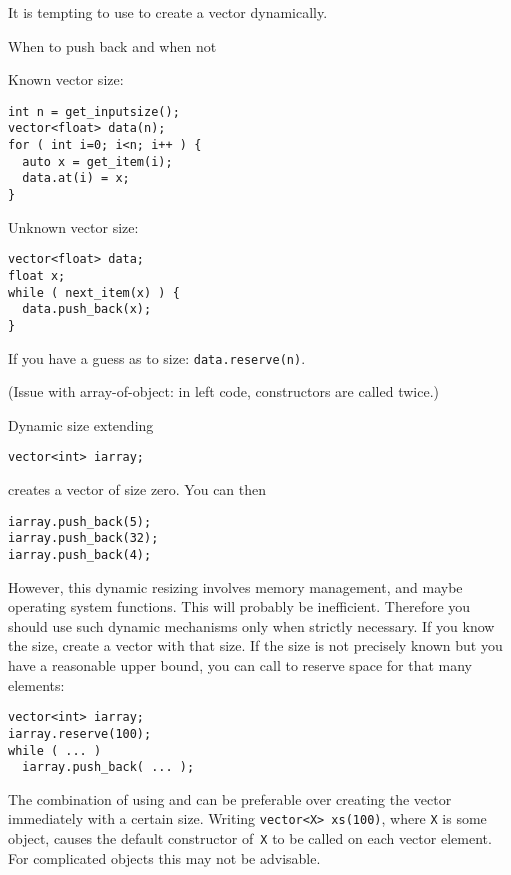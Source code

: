 It is tempting to use  to create a vector dynamically.

\begin{block}{When to push back and when not}
  \label{sl:vecpushnot}
  \begin{multicols}{2}
    Known vector size:
\begin{lstlisting}
int n = get_inputsize();
vector<float> data(n);
for ( int i=0; i<n; i++ ) {
  auto x = get_item(i);
  data.at(i) = x;
}
\end{lstlisting}
\columnbreak
    Unknown vector size:
\begin{lstlisting}
vector<float> data;
float x;
while ( next_item(x) ) {
  data.push_back(x);
}
\end{lstlisting}
  \end{multicols}
  If you have a guess as to size: \lstinline+data.reserve(n)+.

  (Issue with array-of-object: in left code, constructors are called twice.)
\end{block}

\begin{block}{Dynamic size extending}
  \label{sl:vector-extend}
\begin{lstlisting}
vector<int> iarray;
\end{lstlisting}
creates a vector of size zero. You can then
\begin{lstlisting}
iarray.push_back(5);
iarray.push_back(32);
iarray.push_back(4);
\end{lstlisting}
\end{block}

However, this dynamic resizing involves memory management, and maybe
operating system functions. This will probably be
inefficient. Therefore you should use such dynamic mechanisms only
when strictly necessary.
If you know the size,
create a vector with that size. If the size is not precisely known but
you have a reasonable upper bound, you can call  to
reserve space for that many elements:
\begin{lstlisting}
vector<int> iarray;
iarray.reserve(100);
while ( ... )
  iarray.push_back( ... );
\end{lstlisting}

The combination of using  and 
can be preferable over creating the vector immediately with a certain size.
Writing \lstinline+vector<X> xs(100)+, where \lstinline{X} is some object,
causes the default constructor of~\lstinline{X} to be called on each vector element.
For complicated objects this may not be advisable.


